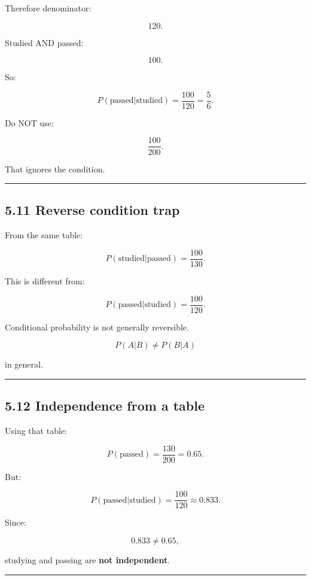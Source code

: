 \documentclass[
]{article}
\begin{document}
Therefore denominator:

\[
120.
\]

Studied AND passed:

\[
100.
\]

So:

\[
P(\text{passed}|\text{studied})
=
\frac{100}{120}
=
\boxed{\frac56}.
\]

Do NOT use:

\[
\frac{100}{200}.
\]

That ignores the condition.

\begin{center}\rule{0.5\linewidth}{0.5pt}\end{center}

\subsection{5.11 Reverse condition trap}\label{reverse-condition-trap}

From the same table:

\[
P(\text{studied}|\text{passed})
=
\frac{100}{130}.
\]

This is different from:

\[
P(\text{passed}|\text{studied})
=
\frac{100}{120}.
\]

Conditional probability is not generally reversible.

\[
\boxed{P(A|B)\neq P(B|A)}
\]

in general.

\begin{center}\rule{0.5\linewidth}{0.5pt}\end{center}

\subsection{5.12 Independence from a
table}\label{independence-from-a-table}

Using that table:

\[
P(\text{passed})
=
\frac{130}{200}=0.65.
\]

But:

\[
P(\text{passed}|\text{studied})
=
\frac{100}{120}
\approx0.833.
\]

Since:

\[
0.833\neq0.65,
\]

studying and passing are \textbf{not independent}.

\begin{center}\rule{0.5\linewidth}{0.5pt}\end{center}
\end{document}
